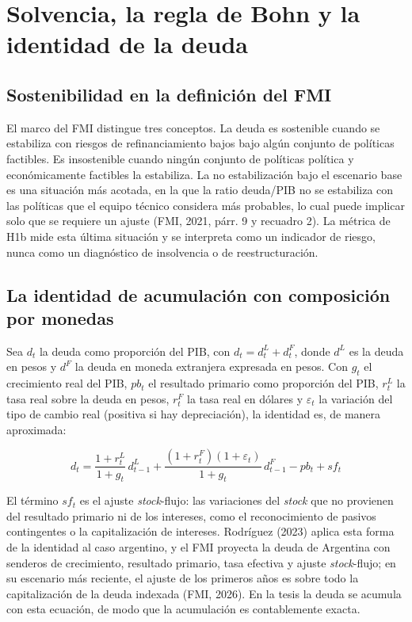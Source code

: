 \section{Solvencia, la regla de Bohn y la identidad de la deuda}

\subsection{Sostenibilidad en la definición del FMI}

El marco del FMI distingue tres conceptos. La deuda es sostenible cuando
se estabiliza con riesgos de refinanciamiento bajos bajo algún conjunto
de políticas factibles. Es insostenible cuando ningún conjunto de
políticas política y económicamente factibles la estabiliza. La no
estabilización bajo el escenario base es una situación más acotada, en
la que la ratio deuda/PIB no se estabiliza con las políticas que el
equipo técnico considera más probables, lo cual puede implicar solo que
se requiere un ajuste (FMI, 2021, párr. 9 y recuadro 2). La métrica de
H1b mide esta última situación y se interpreta como un indicador de
riesgo, nunca como un diagnóstico de insolvencia o de reestructuración.

\subsection{La identidad de acumulación con composición por monedas}

Sea \(d_t\) la deuda como proporción del PIB, con
\(d_t = d^L_t + d^F_t\), donde \(d^L\) es la deuda en pesos y \(d^F\) la
deuda en moneda extranjera expresada en pesos. Con \(g_t\) el
crecimiento real del PIB, \(pb_t\) el resultado primario como proporción
del PIB, \(r^L_t\) la tasa real sobre la deuda en pesos, \(r^F_t\) la
tasa real en dólares y \(\varepsilon_t\) la variación del tipo de cambio
real (positiva si hay depreciación), la identidad es, de manera
aproximada:

\[d_t = \frac{1+r^L_t}{1+g_t}\, d^L_{t-1} + \frac{(1+r^F_t)(1+\varepsilon_t)}{1+g_t}\, d^F_{t-1} - pb_t + sf_t\]

El término \(sf_t\) es el ajuste \emph{stock}-flujo: las variaciones del
\emph{stock} que no provienen del resultado primario ni de los
intereses, como el reconocimiento de pasivos contingentes o la
capitalización de intereses. Rodríguez (2023) aplica esta forma de la
identidad al caso argentino, y el FMI proyecta la deuda de Argentina con
senderos de crecimiento, resultado primario, tasa efectiva y ajuste
\emph{stock}-flujo; en su escenario más reciente, el ajuste de los
primeros años es sobre todo la capitalización de la deuda indexada (FMI,
2026). En la tesis la deuda se acumula con esta ecuación, de modo que la
acumulación es contablemente exacta.

